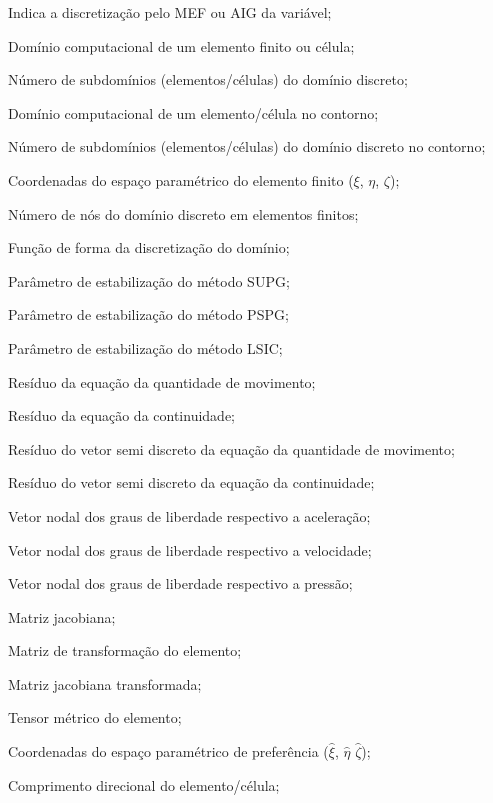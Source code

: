 \begin{simbolos}
\item[$(\bullet)^h$] Indica a discretização pelo MEF ou AIG da variável;
\item[$\domainE$] Domínio computacional de um elemento finito ou célula;
\item[$\nel$] Número de subdomínios (elementos/células) do domínio discreto;
\item[$\boundary^{b}$] Domínio computacional de um elemento/célula no contorno;
\item[$\neb$] Número de subdomínios (elementos/células) do domínio discreto no contorno;
\item[$\coordAdimen$] Coordenadas do espaço paramétrico do elemento finito ($\xi$, $\eta$, $\zeta$);
\item[$\nnos$] Número de nós do domínio discreto em elementos finitos;
\item[$\shapef$] Função de forma da discretização do domínio;
\item[$\SUPG$] Parâmetro de estabilização do método SUPG;
\item[$\PSPG$] Parâmetro de estabilização do método PSPG;
\item[$\LSIC$] Parâmetro de estabilização do método LSIC;
\item[$\resMom$] Resíduo da equação da quantidade de movimento;
\item[$\resPre$] Resíduo da equação da continuidade;
\item[$\NNSM$] Resíduo do vetor semi discreto da equação da quantidade de movimento;
\item[$\NNSC$] Resíduo do vetor semi discreto da equação da continuidade;
\item[$\Acceleration$] Vetor nodal dos graus de liberdade respectivo a aceleração;
\item[$\Velocity$] Vetor nodal dos graus de liberdade respectivo a velocidade;
\item[$\Press$] Vetor nodal dos graus de liberdade respectivo a pressão;
\item[$\matrixQ$] Matriz jacobiana;
\item[$\matrixD$] Matriz de transformação do elemento;
\item[$\matrixQhat$] Matriz jacobiana transformada;
\item[$\matrixG$] Tensor métrico do elemento;
\item[$\hat{\coordAdimen}$] Coordenadas do espaço paramétrico de preferência ($\hat{\xi}$, $\hat{\eta}$ $\hat{\zeta}$);
\item[$\RGN$] Comprimento direcional do elemento/célula;

\end{simbolos}
